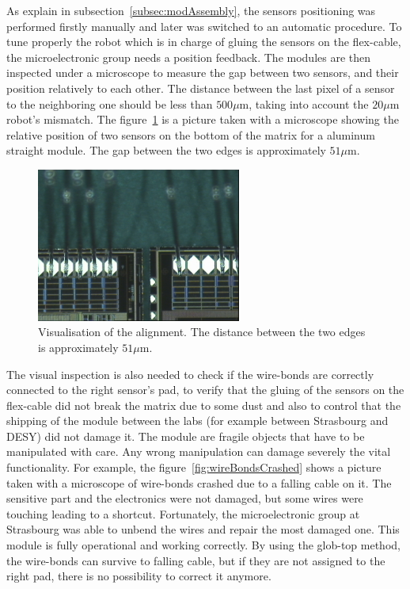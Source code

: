  As explain in subsection~\ref{subsec:modAssembly}, the sensors positioning was performed firstly manually and later was switched to an automatic procedure.
  To tune properly the robot which is in charge of gluing the sensors on the flex-cable, the microelectronic group needs a position feedback.
  The modules are then inspected under a microscope to measure the gap between two sensors, and their position relatively to each other.
  The distance between the last pixel of a sensor to the neighboring one should be less than $500 \mu\text{m}$, taking into account the $20\mu\text{m}$ robot's mismatch.
  The figure~\ref{fig:visAlign} is a picture taken with a microscope showing the relative position of two sensors on the bottom of the matrix for a aluminum straight module.
  The gap between the two edges is approximately $51 \mu\text{m}$. 
  
  \begin{figure}
    \centering
    \includegraphics[width=0.6\textwidth]{Pictures/labTests/alignment_sensors.jpg}
    \caption{Visualisation of the alignment. The distance between the two edges is approximately $51 \mu\text{m}$.}
    \label{fig:visAlign}
  \end{figure}
  
  The visual inspection is also needed to check if the wire-bonds are correctly connected to the right sensor's pad, to verify that the gluing of the sensors on the flex-cable did not break the matrix due to some dust and also to control that the shipping of the module between the labs (for example between Strasbourg and DESY) did not damage it.
  The module are fragile objects that have to be manipulated with care.
  Any wrong manipulation can damage severely the vital functionality.
  For example, the figure~\ref{fig:wireBondsCrashed} shows a picture taken with a microscope of wire-bonds crashed due to a falling cable on it.
  The sensitive part and the electronics were not damaged, but some wires were touching leading to a shortcut.
  Fortunately, the microelectronic group at Strasbourg was able to unbend the wires and repair the most damaged one.
  This module is fully operational and working correctly.
  By using the glob-top method, the wire-bonds can survive to falling cable, but if they are not assigned to the right pad, there is no possibility to correct it anymore.

